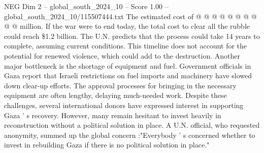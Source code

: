 \begin{textsample}{NEG Dim 2 – global\_south\_2024\_10 – Score 1.00 – global\_south\_2024\_10/115507444.txt}
The estimated cost of @ @ @ @ @ @ @ @ @ @ million.
If the war were to end today, the total cost to clear all the rubble could reach \$1.2 billion.
The U.N. predicts that the process could take 14 years to complete, assuming current conditions.
This timeline does not account for the potential for renewed violence, which could add to the destruction.
Another major bottleneck is the shortage of equipment and fuel.
Government officials in Gaza report that Israeli restrictions on fuel imports and machinery have slowed down clear-up efforts.
The approval processes for bringing in the necessary equipment are often lengthy, delaying much-needed work.
Despite these challenges, several international donors have expressed interest in supporting Gaza ' s recovery.
However, many remain hesitant to invest heavily in reconstruction without a political solution in place.
A U.N. official, who requested anonymity, summed up the global concern :"Everybody ' s concerned whether to invest in rebuilding Gaza if there is no political solution in place."

\end{textsample}
